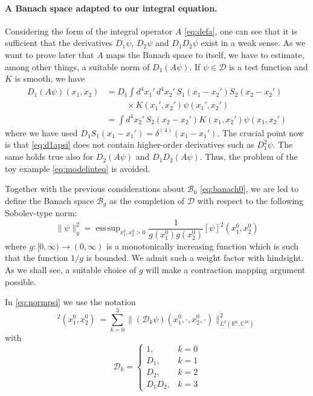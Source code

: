 \documentclass[b5paper,draft,openbib,12pt]{memoir}
\newcommand{\R}{\mathbb{R}}
\newcommand{\CC}{\mathbb{C}}
\newcommand{\Banach}{\mathscr{B}}
\DeclareMathOperator*{\esssup}{ess \, sup}
\begin{document}
\paragraph{A Banach space adapted to our integral equation.} Considering the form of the integral operator $A$ \eqref{eq:defa}, one can see that it is sufficient that the derivatives $D_1 \psi$, $D_2 \psi$ and $D_1 D_2 \psi$ exist in a weak sense. As we want to prove later that $A$ maps the Banach space to itself, we have to estimate, among other things, a suitable norm of $D_1 (A \psi)$. If $\psi \in \mathscr{D}$ is a test function and $K$ is smooth, we have
\begin{align}\nonumber
  D_1 (A \psi)(x_1,x_2) &= D_1 \int d^4 x_1' \, d^4 x_2' \, S_1(x_1-x_2') S_2(x_2-x_2')\\
  &\hspace{1cm}\times K(x_1',x_2') \psi(x_1',x_2')\nonumber\\
	&= \int d^4 x_2' \, S_2(x_2-x_2') K(x_1,x_2') \psi(x_1,x_2')
\label{eq:d1apsi}
\end{align}
where we have used $D_1 S_1(x_1-x_1') = \delta^{(4)}(x_1-x_1')$. The crucial point now is that \eqref{eq:d1apsi} does not contain higher-order derivatives such as $D_1^2 \psi$. The same holds true also for $D_2 (A \psi)$ and $D_1 D_2 (A\psi)$. Thus, the problem of the toy example \eqref{eq:modelinteq} is avoided.

Together with the previous considerations about $\Banach_0$ \eqref{eq:banach0}, we are led to define the Banach space $\Banach_g$ as the completion of $\mathscr{D}$ with respect to the following Sobolev-type norm:
\begin{equation}
	\| \psi \|^2_g = \esssup_{x_1^0,x_2^0 >0} \frac{1}{g(x_1^0)g(x_2^0)} [\psi]^2(x_1^0,x_2^0)
\label{eq:normpsi}
\end{equation}
where \(g : [0,\infty) \rightarrow (0,\infty) \) is a monotonically increasing function which is such that the function $1/g$ is bounded. We admit such a weight factor with hindsight. As we shall see, a suitable choice of $g$ will make a contraction mapping argument possible.

In \eqref{eq:normpsi} we use the notation
\begin{equation}
	[\psi]^2(x_1^0,x_2^0) ~= \sum_{k=0}^3 \| (\mathcal{D}_k \psi)(x_1^0, \cdot, x_2^0,\cdot)\|^2_{L^2(\R^6,\CC^{16})}
\label{eq:spatialnorm}
\end{equation}
with
\begin{equation}
	\mathcal{D}_k = \left\{ \begin{array}{cl} 1, &k=0\\ D_1, & k=1\\ D_2, & k=2 \\ D_1 D_2, & k=3 \end{array}\right. 
\label{eq:defdk}
\end{equation}
\end{document}
